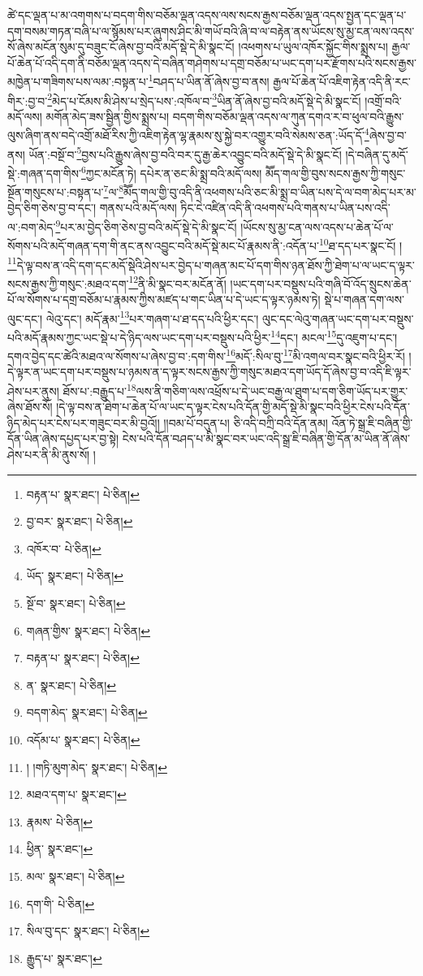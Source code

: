 ཚེ་དང་ལྡན་པ་མ་འགགས་པ་བདག་གིས་བཅོམ་ལྡན་འདས་ལས་སངས་རྒྱས་བཅོམ་ལྡན་འདས་སྤྱན་དང་ལྡན་པ་དག་བསམ་གཏན་བཞི་པ་ལ་སྙོམས་པར་ཞུགས་ཤིང་མི་གཡོ་བའི་ཞི་བ་ལ་བརྟེན་ནས་ཡོངས་སུ་མྱ་ངན་ལས་འདས་སོ་ཞེས་མངོན་སུམ་དུ་བཟུང་ངོ་ཞེས་བྱ་བའི་མདོ་སྡེ་དེ་མི་སྣང་ངོ། །འཕགས་པ་ཡུལ་འཁོར་སྐྱོང་གིས་སྨྲས་པ། རྒྱལ་པོ་ཆེན་པོ་འདི་དག་ནི་བཅོམ་ལྡན་འདས་དེ་བཞིན་གཤེགས་པ་དགྲ་བཅོམ་པ་ཡང་དག་པར་རྫོགས་པའི་སངས་རྒྱས་མཁྱེན་པ་གཟིགས་པས་ལམ་:བསྟན་པ་\footnote{བརྟན་པ་  སྣར་ཐང་།  པེ་ཅིན། }བཤད་པ་ཡིན་ནོ་ཞེས་བྱ་བ་ནས། རྒྱལ་པོ་ཆེན་པོ་འཇིག་རྟེན་འདི་ནི་རང་གིར་:བྱ་བ་\footnote{བྱ་བར་  སྣར་ཐང་།  པེ་ཅིན། }མེད་པ་ངོམས་མི་ཤེས་པ་སྲེད་པས་:འཁོལ་བ་\footnote{འཁོར་བ་  པེ་ཅིན། }ཡིན་ནོ་ཞེས་བྱ་བའི་མདོ་སྡེ་དེ་མི་སྣང་ངོ། །འགྲོ་བའི་མདོ་ལས། མགོན་མེད་ཟས་སྦྱིན་གྱིས་སྨྲས་པ། བདག་གིས་བཅོམ་ལྡན་འདས་ལ་ཀུན་དགའ་ར་བ་ཕུལ་བའི་རྒྱུས་ལུས་ཞིག་ནས་བདེ་འགྲོ་མཐོ་རིས་ཀྱི་འཇིག་རྟེན་ལྷ་རྣམས་སུ་སྐྱེ་བར་འགྱུར་བའི་སེམས་ཅན་:ཡོད་དོ་\footnote{ཡོད་  སྣར་ཐང་།  པེ་ཅིན། }ཞེས་བྱ་བ་ནས། ཡོན་:བསྔོ་བ་\footnote{སྔོ་བ་  སྣར་ཐང་།  པེ་ཅིན། }བྱས་པའི་རྒྱུས་ཞེས་བྱ་བའི་བར་དུ་རྒྱ་ཆེར་འབྱུང་བའི་མདོ་སྡེ་དེ་མི་སྣང་ངོ། །དེ་བཞིན་དུ་མདོ་སྡེ་:གཞན་དག་གིས་\footnote{གཞན་གྱིས་  སྣར་ཐང་།  པེ་ཅིན། }ཀྱང་མངོན་ཏེ། དཔེར་ན་ཅང་མི་སྨྲ་བའི་མདོ་ལས། མཽད་གལ་གྱི་བུས་སངས་རྒྱས་ཀྱི་གསུང་སྔོན་གསུངས་པ་:བསྟན་པ་\footnote{བརྟན་པ་  སྣར་ཐང་།  པེ་ཅིན། }ལ་\footnote{ན་  སྣར་ཐང་།  པེ་ཅིན། }མཽད་གལ་གྱི་བུ་འདི་ནི་འཕགས་པའི་ཅང་མི་སྨྲ་བ་ཡིན་པས་དེ་ལ་བག་མེད་པར་མ་བྱེད་ཅིག་ཅེས་བྱ་བ་དང་། གནས་པའི་མདོ་ལས། ཏིང་ངེ་འཛིན་འདི་ནི་འཕགས་པའི་གནས་པ་ཡིན་པས་འདི་ལ་:བག་མེད་\footnote{བདག་མེད་  སྣར་ཐང་།  པེ་ཅིན། }པར་མ་བྱེད་ཅིག་ཅེས་བྱ་བའི་མདོ་སྡེ་དེ་མི་སྣང་ངོ། །ཡོངས་སུ་མྱ་ངན་ལས་འདས་པ་ཆེན་པོ་ལ་སོགས་པའི་མདོ་གཞན་དག་གི་ནང་ནས་འབྱུང་བའི་མདོ་སྡེ་མང་པོ་རྣམས་ནི་:འདོན་པ་\footnote{འདོམ་པ་  སྣར་ཐང་།  པེ་ཅིན། }ཐ་དད་པར་སྣང་ངོ། །\footnote{། །གཏི་མུག་མེད་  སྣར་ཐང་།  པེ་ཅིན། }དེ་ལྟ་བས་ན་འདི་དག་དང་མདོ་སྡེའི་ཤེས་པར་བྱེད་པ་གཞན་མང་པོ་དག་གིས་ཉན་ཐོས་ཀྱི་ཐེག་པ་ལ་ཡང་ད་ལྟར་སངས་རྒྱས་ཀྱི་གསུང་:མཐའ་དག་\footnote{མཐའ་དག་པ་  སྣར་ཐང་། }ནི་མི་སྣང་བར་མངོན་ནོ། །ཡང་དག་པར་བསྡུས་པའི་གཞི་བོ་འོད་སྲུངས་ཆེན་པོ་ལ་སོགས་པ་དགྲ་བཅོམ་པ་རྣམས་ཀྱིས་མཛད་པ་གང་ཡིན་པ་དེ་ཡང་ད་ལྟར་ཉམས་ཏེ། སྡེ་པ་གཞན་དག་ལས་ལུང་དང་། ལེའུ་དང་། མདོ་རྣམ་\footnote{རྣམས་  པེ་ཅིན། }པར་གཞག་པ་ཐ་དད་པའི་ཕྱིར་དང་། ལུང་དང་ལེའུ་གཞན་ཡང་དག་པར་བསྡུས་པའི་མདོ་རྣམས་ཀྱང་ཡང་སྡེ་པ་དེ་ཉིད་ལས་ཡང་དག་པར་བསྡུས་པའི་ཕྱིར་\footnote{ཕྱིན་  སྣར་ཐང་། }དང་། མངལ་\footnote{མལ་  སྣར་ཐང་།  པེ་ཅིན། }དུ་འཇུག་པ་དང་། དགའ་བྱེད་དང་ཚེའི་མཐའ་ལ་སོགས་པ་ཞེས་བྱ་བ་:དག་གིས་\footnote{དག་གི་  པེ་ཅིན། }མདོ་:སིལ་བུ་\footnote{སིལ་བུ་དང་  སྣར་ཐང་།  པེ་ཅིན། }མི་འགལ་བར་སྣང་བའི་ཕྱིར་རོ། །དེ་ལྟར་ན་ཡང་དག་པར་བསྡུས་པ་ཉམས་ན་ད་ལྟར་སངས་རྒྱས་ཀྱི་གསུང་མཐའ་དག་ཡོད་དོ་ཞེས་བྱ་བ་འདི་ཇི་ལྟར་ཤེས་པར་ནུས། ཐོས་པ་:བརྒྱུད་པ་\footnote{རྒྱུད་པ་  སྣར་ཐང་། }ལས་ནི་གཅིག་ལས་འཕྲོས་པ་དེ་ཡང་བརྒྱ་ལ་ཐུག་པ་དག་ཅིག་ཡོད་པར་གྱུར་ཞེས་ཐོས་སོ། །དེ་ལྟ་བས་ན་ཐེག་པ་ཆེན་པོ་ལ་ཡང་ད་ལྟར་ངེས་པའི་དོན་གྱི་མདོ་སྡེ་མི་སྣང་བའི་ཕྱིར་ངེས་པའི་དོན་ཉིད་མེད་པར་ངེས་པར་གཟུང་བར་མི་བྱའོ།། །།བམ་པོ་བདུན་པ། ཅི་འདི་བཀྲི་བའི་དོན་ནམ། འོན་ཏེ་སྒྲ་ཇི་བཞིན་གྱི་དོན་ཡིན་ཞེས་དཔྱད་པར་བྱ་སྟེ། ངེས་པའི་དོན་བཤད་པ་མི་སྣང་བར་ཡང་འདི་སྒྲ་ཇི་བཞིན་གྱི་དོན་མ་ཡིན་ནོ་ཞེས་ཤེས་པར་ནི་མི་ནུས་སོ། །
